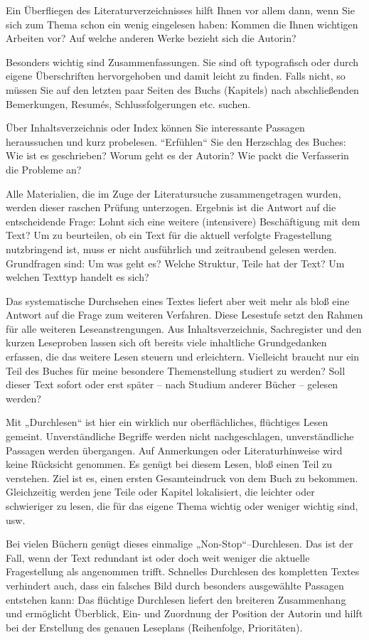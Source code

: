 \documentclass[]{book}
\theoremstyle{definition}
\theoremstyle{definition}
\theoremstyle{definition}
\theoremstyle{remark}
\begin{document}
Ein Überfliegen des Literaturverzeichnisses hilft Ihnen vor allem dann,
wenn Sie sich zum Thema schon ein wenig eingelesen haben: Kommen die
Ihnen wichtigen Arbeiten vor? Auf welche anderen Werke bezieht sich die
Autorin?

Besonders wichtig sind Zusammenfassungen. Sie sind oft typografisch oder
durch eigene Überschriften hervorgehoben und damit leicht zu finden.
Falls nicht, so müssen Sie auf den letzten paar Seiten des Buchs
(Kapitels) nach abschließenden Bemerkungen, Resumés, Schlussfolgerungen
etc. suchen.

Über Inhaltsverzeichnis oder Index können Sie interessante Passagen
heraussuchen und kurz probelesen. ``Erfühlen`` Sie den Herzschlag des
Buches: Wie ist es geschrieben? Worum geht es der Autorin? Wie packt die
Verfasserin die Probleme an?

Alle Materialien, die im Zuge der Literatursuche zusammengetragen
wurden, werden dieser raschen Prüfung unterzogen. Ergebnis ist die
Antwort auf die entscheidende Frage: Lohnt sich eine weitere
(intensivere) Beschäftigung mit dem Text? Um zu beurteilen, ob ein Text
für die aktuell verfolgte Fragestellung nutzbringend ist, muss er nicht
ausführlich und zeitraubend gelesen werden. Grundfragen sind: Um was
geht es? Welche Struktur, Teile hat der Text? Um welchen Texttyp handelt
es sich?

Das systematische Durchsehen eines Textes liefert aber weit mehr als
bloß eine Antwort auf die Frage zum weiteren Verfahren. Diese Lesestufe
setzt den Rahmen für alle weiteren Leseanstrengungen. Aus
Inhaltsverzeichnis, Sachregister und den kurzen Leseproben lassen sich
oft bereits viele inhaltliche Grundgedanken erfassen, die das weitere
Lesen steuern und erleichtern. Vielleicht braucht nur ein Teil des
Buches für meine besondere Themenstellung studiert zu werden? Soll
dieser Text sofort oder erst später -- nach Studium anderer Bücher --
gelesen werden?

Mit „Durchlesen`` ist hier ein wirklich nur oberflächliches, flüchtiges
Lesen gemeint. Unverständliche Begriffe werden nicht nachgeschlagen,
unverständliche Passagen werden übergangen. Auf Anmerkungen oder
Literaturhinweise wird keine Rücksicht genommen. Es genügt bei diesem
Lesen, bloß einen Teil zu verstehen. Ziel ist es, einen ersten
Gesamteindruck von dem Buch zu bekommen. Gleichzeitig werden jene Teile
oder Kapitel lokalisiert, die leichter oder schwieriger zu lesen, die
für das eigene Thema wichtig oder weniger wichtig sind, usw.

Bei vielen Büchern genügt dieses einmalige „Non-Stop``--Durchlesen. Das
ist der Fall, wenn der Text redundant ist oder doch weit weniger die
aktuelle Fragestellung als angenommen trifft. Schnelles Durchlesen des
kompletten Textes verhindert auch, dass ein falsches Bild durch
besonders ausgewählte Passagen entstehen kann: Das flüchtige Durchlesen
liefert den breiteren Zusammenhang und ermöglicht Überblick, Ein- und
Zuordnung der Position der Autorin und hilft bei der Erstellung des
genauen Leseplans (Reihenfolge, Prioritäten).
\end{document}
